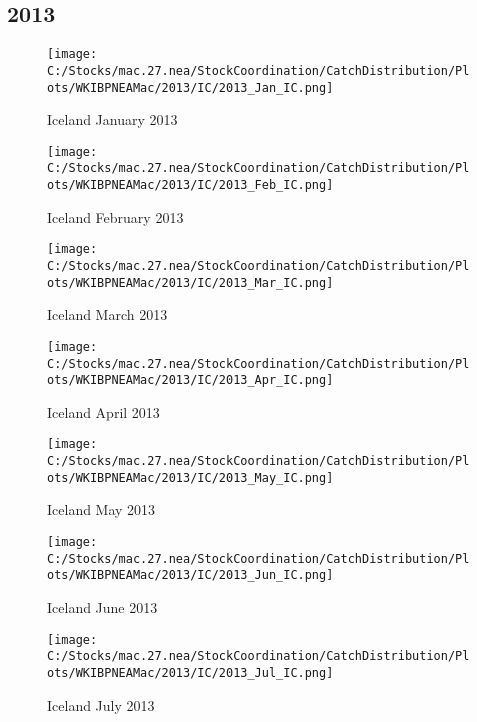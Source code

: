 \documentclass{article}
\begin{document}
\subsection{2013}



\begin{figure}[h]
	\centering
		\texttt{[image: C:/Stocks/mac.27.nea/StockCoordination/CatchDistribution/Plots/WKIBPNEAMac/2013/IC/2013\_Jan\_IC.png]}
	\caption{Iceland January 2013}
	\label{fig:2013_Jan_IC}
\end{figure}

\begin{figure}
	\centering
		\texttt{[image: C:/Stocks/mac.27.nea/StockCoordination/CatchDistribution/Plots/WKIBPNEAMac/2013/IC/2013\_Feb\_IC.png]}
	\caption{Iceland February 2013}
	\label{fig:2013_Feb_IC}
\end{figure}

\begin{figure}
	\centering
		\texttt{[image: C:/Stocks/mac.27.nea/StockCoordination/CatchDistribution/Plots/WKIBPNEAMac/2013/IC/2013\_Mar\_IC.png]}
	\caption{Iceland March 2013}
	\label{fig:2013_Mar_IC}
\end{figure}

\begin{figure}
	\centering
		\texttt{[image: C:/Stocks/mac.27.nea/StockCoordination/CatchDistribution/Plots/WKIBPNEAMac/2013/IC/2013\_Apr\_IC.png]}
	\caption{Iceland April 2013}
	\label{fig:2013_Apr_IC}
\end{figure}

\begin{figure}
	\centering
		\texttt{[image: C:/Stocks/mac.27.nea/StockCoordination/CatchDistribution/Plots/WKIBPNEAMac/2013/IC/2013\_May\_IC.png]}
	\caption{Iceland May 2013}
	\label{fig:2013_May_IC}
\end{figure}

\begin{figure}
	\centering
		\texttt{[image: C:/Stocks/mac.27.nea/StockCoordination/CatchDistribution/Plots/WKIBPNEAMac/2013/IC/2013\_Jun\_IC.png]}
	\caption{Iceland June 2013}
	\label{fig:2013_Jun_IC}
\end{figure}

\begin{figure}
	\centering
		\texttt{[image: C:/Stocks/mac.27.nea/StockCoordination/CatchDistribution/Plots/WKIBPNEAMac/2013/IC/2013\_Jul\_IC.png]}
	\caption{Iceland July 2013}
	\label{fig:2013_Jul_IC}
\end{figure}
\end{document}
